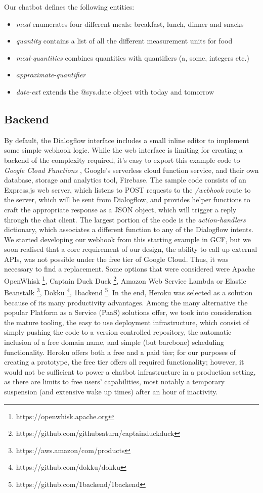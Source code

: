 Our chatbot defines the following entities:
\begin{itemize}
  \item \textit{meal} enumerates four different meals: breakfast, lunch, dinner and snacks
  \item \textit{quantity} contains a list of all the different measurement units for food
  \item \textit{meal-quantities} combines quantities with quantifiers (a, some, integers etc.)
  \item \textit{approximate-quantifier}
  \item \textit{date-ext} extends the @sys.date object with today and tomorrow
\end{itemize}

\subsection{Backend}
By default, the Dialogflow interface includes a small inline editor to implement some simple webhook logic. While the web interface is limiting for creating a backend of the complexity required, it's easy to export this example code to \textit{Google Cloud Functions} \cite{gcfwebsite}, Google's serverless cloud function service, and their own database, storage and analytics tool, Firebase. 
The sample code consists of an Express.js \cite{expresswebsite} web server, which listens to POST requests to the \textit{/webhook} route to the server, which will be sent from Dialogflow, and provides helper functions to craft the appropriate response as a JSON object, which will trigger a reply through the chat client. The largest portion of the code is the \textit{action-handlers} dictionary, which associates a different function to any of the Dialogflow intents. \\
We started developing our webhook from this starting example in GCF, but we soon realised that a core requirement of our design, the ability to call up external APIs, was not possible under the free tier of Google Cloud. Thus, it was necessary to find a replacement. Some options that were considered were Apache OpenWhisk \footnote{https://openwhisk.apache.org}, Captain Duck Duck \footnote{https://github.com/githubsaturn/captainduckduck}, Amazon Web Service Lambda or Elastic Beanstalk \footnote{https://aws.amazon/com/products}, Dokku \footnote{https://github.com/dokku/dokku}, 1backend \footnote{https://github.com/1backend/1backend}. In the end, Heroku was selected as a solution because of its many productivity advantages. Among the many alternative the popular Platform as a Service (PaaS) solutions offer, we took into consideration the mature tooling, the easy to use deployment infrastructure, which consist of simply pushing the code to a version controlled repository, the automatic inclusion of a free domain name, and simple (but barebone) scheduling functionality. Heroku offers both a free and a paid tier; for our purposes of creating a prototype, the free tier offers all required functionality; however, it would not be sufficient to power a chatbot infrastructure in a production setting, as there are limits to free users' capabilities, most notably a temporary suspension (and extensive wake up times) after an hour of inactivity.
